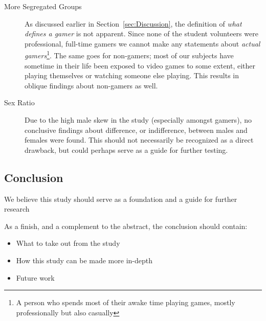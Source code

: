 \documentclass[runningheads,a4paper,oribibl]{llncs}
\begin{document}
\begin{description}
	\item[More Segregated Groups] As discussed earlier in Section~\ref{sec:Discussion}, the definition of \emph{what defines a gamer} is not apparent. Since none of the student volunteers were professional, full-time gamers we cannot make any statements about \emph{actual gamers}\footnote{A person who spends most of their awake time playing games, mostly professionally but also casually}. The same goes for non-gamers; most of our subjects have sometime in their life been exposed to video games to some extent, either playing themselves or watching someone else playing. This results in oblique findings about non-gamers as well.

	\item[Sex Ratio] Due to the high male skew in the study (especially amongst gamers), no conclusive findings about difference, or indifference, between males and females were found. This should not necessarily be recognized as a direct drawback, but could perhaps serve as a guide for further testing.
\end{description}




\subsection{Conclusion}
We believe this study should serve as a foundation and a guide for further research

As a finish, and a complement to the abstract, the conclusion should contain:
\begin{itemize}
	\item What to take out from the study
	\item How this study can be made more in-depth
	\item Future work
\end{itemize}











\end{document}
